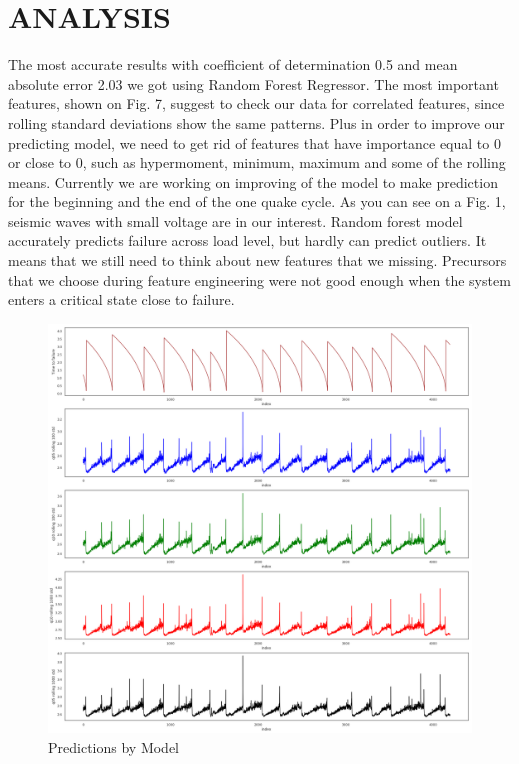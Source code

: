 \documentclass[]{llncs}
\begin{document}
\section{ANALYSIS}
The most accurate results with coefficient of determination 0.5 and mean absolute error 2.03 we got using Random Forest Regressor. The most important features, shown on Fig. 7, suggest to check our data for correlated features, since rolling standard deviations show the same patterns. Plus in order to improve our predicting model, we need to get rid of features that have importance equal to 0 or close to 0, such as hypermoment, minimum, maximum and some of the rolling means. Currently we are working on improving of the model to make prediction for the beginning and the end of the one quake cycle. As you can see on a Fig. 1, seismic waves with small voltage are in our interest. Random forest model accurately predicts failure across load level, but hardly can predict outliers. It means that we still need to think about new features that we missing. Precursors that we choose during feature engineering were not good enough when the system enters a critical state close to failure.
\begin{figure}
	\centering
	\includegraphics[width=1\linewidth]{../GPUProject/Analysis1.png}
	\caption{Predictions by Model}
	\label{fig:morethan90percent}
\end{figure}
\end{document}
